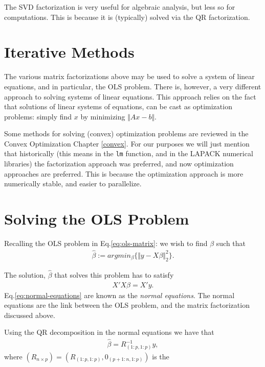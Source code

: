 \documentclass[]{book}
\theoremstyle{definition}
\theoremstyle{definition}
\theoremstyle{definition}
\theoremstyle{remark}
\begin{document}
The SVD factorization is very useful for algebraic analysis, but less so for computations.
This is because it is (typically) solved via the QR factorization.

\hypertarget{iterative-methods}{%
\section{Iterative Methods}\label{iterative-methods}}

The various matrix factorizations above may be used to solve a system of linear equations, and in particular, the OLS problem.
There is, however, a very different approach to solving systems of linear equations.
This approach relies on the fact that solutions of linear systems of equations, can be cast as optimization problems: simply find \(x\) by minimizing \(\Vert Ax-b \Vert\).

Some methods for solving (convex) optimization problems are reviewed in the Convex Optimization Chapter \ref{convex}.
For our purposes we will just mention that historically (this means in the \texttt{lm} function, and in the LAPACK numerical libraries) the factorization approach was preferred, and now optimization approaches are preferred.
This is because the optimization approach is more numerically stable, and easier to parallelize.

\hypertarget{solving-ols}{%
\section{Solving the OLS Problem}\label{solving-ols}}

Recalling the OLS problem in Eq.\eqref{eq:ols-matrix}: we wish to find \(\beta\) such that\\
\begin{align}
  \hat \beta:= argmin_\beta \{ \Vert y-X\beta \Vert^2_2 \}.
\end{align}

The solution, \(\hat \beta\) that solves this problem has to satisfy
\begin{align}
  X'X \beta = X'y.
  \label{eq:normal-equations}
\end{align}
Eq.\eqref{eq:normal-equations} are known as the \emph{normal equations}.
The normal equations are the link between the OLS problem, and the matrix factorization discussed above.

Using the QR decomposition in the normal equations we have that
\begin{align*}
  \hat \beta = R_{(1:p,1:p)}^{-1} y,
\end{align*}
where \((R_{n\times p})=(R_{(1:p,1:p)},0_{(p+1:n,1:p)})\) is the
\end{document}
